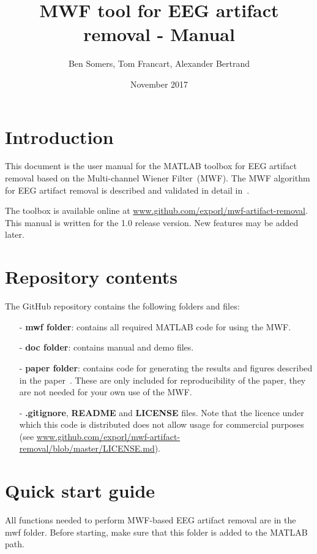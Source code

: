 \documentclass[11pt]{article}
\title{MWF tool for EEG artifact removal - Manual}
\author{Ben Somers, Tom Francart, Alexander Bertrand}
\date{November 2017}
\begin{document}
\maketitle
\tableofcontents
\pagebreak

\section{Introduction}

This document is the user manual for the MATLAB toolbox for EEG artifact removal based on the Multi-channel Wiener Filter~(MWF). The MWF algorithm for EEG artifact removal is described and validated in detail in~\cite{somers2018generic}.

The toolbox is available online at \url{www.github.com/exporl/mwf-artifact-removal}. This manual is written for the 1.0 release version. New features may be added later.

\section{Repository contents}

The GitHub repository contains the following folders and files:

\begin{itemize}[noitemsep]
\item[-] \textbf{mwf folder}: contains all required MATLAB code for using the MWF.
\item[-] \textbf{doc folder}: contains manual and demo files.
\item[-] \textbf{paper folder}: contains code for generating the results and figures described in the paper~\cite{somers2018generic}. These are only included for reproducibility of the paper, they are not needed for your own use of the MWF.
\item[-] \textbf{.gitignore}, \textbf{README} and \textbf{LICENSE} files. Note that the licence under which this code is distributed does not allow usage for commercial purposes (see \url{www.github.com/exporl/mwf-artifact-removal/blob/master/LICENSE.md}).
\end{itemize}

\section{Quick start guide}
\label{sec:quickstart}

All functions needed to perform MWF-based EEG artifact removal are in the mwf folder. Before starting, make sure that this folder is added to the MATLAB path.
\end{document}
